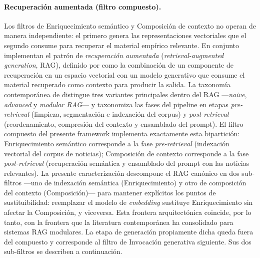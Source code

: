 \documentclass[12pt]{report}
\begin{document}
\paragraph{Recuperación aumentada (filtro compuesto).} Los filtros de Enriquecimiento semántico y Composición de contexto no operan de manera independiente: el primero genera las representaciones vectoriales que el segundo consume para recuperar el material empírico relevante. En conjunto implementan el patrón de \textit{recuperación aumentada} (\textit{retrieval-augmented generation}, RAG), definido por \citet{lewis:2020} como la combinación de un componente de recuperación en un espacio vectorial con un modelo generativo que consume el material recuperado como contexto para producir la salida. La taxonomía contemporánea de \citet{gao:2024} distingue tres variantes principales dentro del RAG ---\textit{naive}, \textit{advanced} y \textit{modular RAG}--- y taxonomiza las fases del pipeline en etapas \textit{pre-retrieval} (limpieza, segmentación e indexación del corpus) y \textit{post-retrieval} (reordenamiento, compresión del contexto y ensamblado del prompt). El filtro compuesto del presente framework implementa exactamente esta bipartición: Enriquecimiento semántico corresponde a la fase \textit{pre-retrieval} (indexación vectorial del corpus de noticias); Composición de contexto corresponde a la fase \textit{post-retrieval} (recuperación semántica y ensamblado del prompt con las noticias relevantes). La presente caracterización descompone el RAG canónico en dos sub-filtros ---uno de indexación semántica (Enriquecimiento) y otro de composición del contexto (Composición)--- para mantener explícitos los puntos de sustituibilidad: reemplazar el modelo de \textit{embedding} sustituye Enriquecimiento sin afectar la Composición, y viceversa. Esta frontera arquitectónica coincide, por lo tanto, con la frontera que la literatura contemporánea ha consolidado para sistemas RAG modulares. La etapa de generación propiamente dicha queda fuera del compuesto y corresponde al filtro de Invocación generativa siguiente. Sus dos sub-filtros se describen a continuación.
\end{document}
